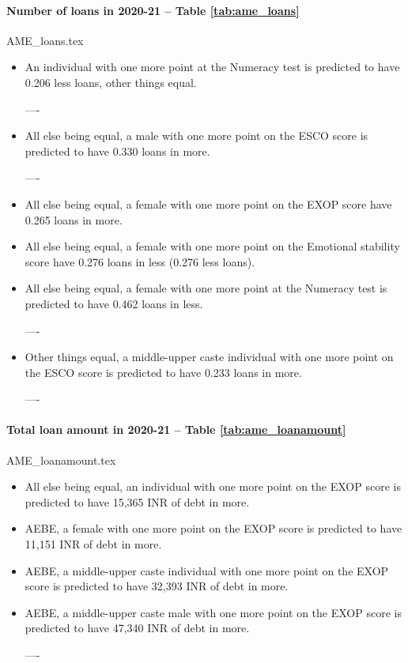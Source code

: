 \documentclass[a4paper, 11pt, onecolumn]{article}
\begin{document}
\clearpage
\newpage
\paragraph*{Number of loans in 2020-21 -- Table \ref{tab:ame_loans}}

{AME_loans.tex}

\begin{itemize}
\item An individual with one more point at the Numeracy test is predicted to have 0.206 less loans, other things equal.
\item[----]
\item All else being equal, a male with one more point on the ESCO score is predicted to have 0.330 loans in more.
\item[----] 
\item All else being equal, a female with one more point on the EXOP score have 0.265 loans in more.
\item All else being equal, a female with one more point on the Emotional stability score have 0.276 loans in less (0.276 less loans).
\item All else being equal, a female with one more point at the Numeracy test is predicted to have 0.462 loans in less.
\item[----] 
\item Other things equal, a middle-upper caste individual with one more point on the ESCO score is predicted to have 0.233 loans in more.
\item[----] 
\end{itemize}



\clearpage
\newpage
\paragraph*{Total loan amount in 2020-21 -- Table \ref{tab:ame_loanamount}}

{AME_loanamount.tex}

\begin{itemize}
\item All else being equal, an individual with one more point on the EXOP score is predicted to have 15,365 INR of debt in more.
\item AEBE, a female with one more point on the EXOP score is predicted to have 11,151 INR of debt in more.
\item AEBE, a middle-upper caste individual with one more point on the EXOP score is predicted to have 32,393 INR of debt in more.
\item AEBE, a middle-upper caste male with one more point on the EXOP score is predicted to have 47,340 INR of debt in more.
\item[----]
\
\end{itemize}
\end{document}
